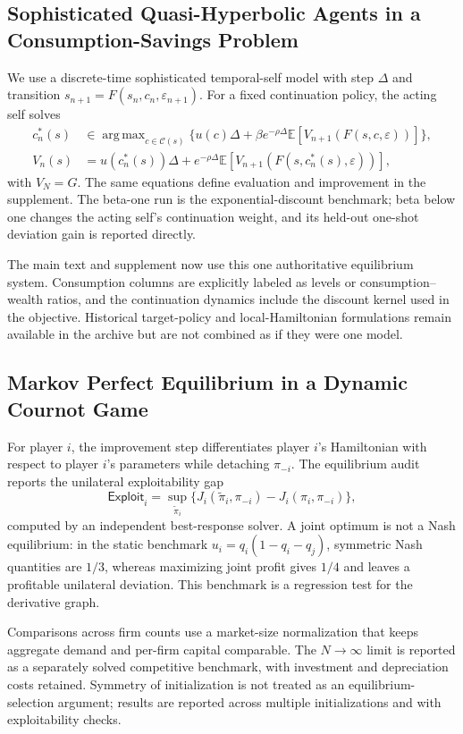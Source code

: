 \documentclass[ecta]{econsocart}
\theoremstyle{plain}
\theoremstyle{remark}
\newcommand{\E}{\mathbb{E}}
\DeclareMathOperator*{\argmax}{arg\,max}
\begin{document}
\subsection{Sophisticated Quasi-Hyperbolic Agents in a Consumption-Savings Problem}
We use a discrete-time sophisticated temporal-self model with step $\Delta$ and transition $s_{n+1}=F(s_n,c_n,\varepsilon_{n+1})$. For a fixed continuation policy, the acting self solves
\begin{align}
c_n^*(s)&\in\argmax_{c\in\mathcal C(s)}\{u(c)\Delta+\beta e^{-\rho\Delta}\E[V_{n+1}(F(s,c,\varepsilon))]\},\\
V_n(s)&=u(c_n^*(s))\Delta+e^{-\rho\Delta}\E[V_{n+1}(F(s,c_n^*(s),\varepsilon))],
\label{eq:r2_soph_objective}
\end{align}
with $V_N=G$. The same equations define evaluation and improvement in the supplement. The beta-one run is the exponential-discount benchmark; beta below one changes the acting self's continuation weight, and its held-out one-shot deviation gain is reported directly.

The main text and supplement now use this one authoritative equilibrium system. Consumption columns are explicitly labeled as levels or consumption--wealth ratios, and the continuation dynamics include the discount kernel used in the objective. Historical target-policy and local-Hamiltonian formulations remain available in the archive but are not combined as if they were one model.

\subsection{Markov Perfect Equilibrium in a Dynamic Cournot Game}
For player $i$, the improvement step differentiates player $i$'s Hamiltonian with respect to player $i$'s parameters while detaching $\pi_{-i}$. The equilibrium audit reports the unilateral exploitability gap
\[
\mathsf{Exploit}_i=\sup_{\tilde\pi_i}\{J_i(\tilde\pi_i,\pi_{-i})-J_i(\pi_i,\pi_{-i})\},
\]
computed by an independent best-response solver. A joint optimum is not a Nash equilibrium: in the static benchmark $u_i=q_i(1-q_i-q_j)$, symmetric Nash quantities are $1/3$, whereas maximizing joint profit gives $1/4$ and leaves a profitable unilateral deviation. This benchmark is a regression test for the derivative graph.

Comparisons across firm counts use a market-size normalization that keeps aggregate demand and per-firm capital comparable. The $N\to\infty$ limit is reported as a separately solved competitive benchmark, with investment and depreciation costs retained. Symmetry of initialization is not treated as an equilibrium-selection argument; results are reported across multiple initializations and with exploitability checks.
\end{document}
